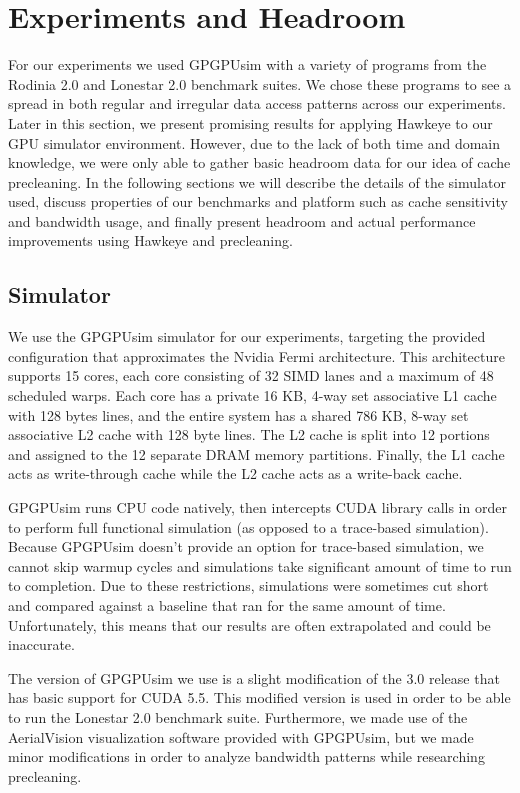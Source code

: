\chapter{Experiments and Headroom}

For our experiments we used GPGPUsim with a variety of programs from the Rodinia 2.0 \cite{rodinia} and Lonestar 2.0 \cite{lonestar} benchmark suites. We chose these programs to see a spread in both regular and irregular data access patterns across our experiments. Later in this section, we present promising results for applying Hawkeye to our GPU simulator environment. However, due to the lack of both time and domain knowledge, we were only able to gather basic headroom data for our idea of cache precleaning. In the following sections we will describe the details of the simulator used, discuss properties of our benchmarks and platform such as cache sensitivity and bandwidth usage, and finally present headroom and actual performance improvements using Hawkeye and precleaning.

\section{Simulator}
We use the GPGPUsim \cite{gpgpusim} simulator for our experiments, targeting the provided configuration that approximates the Nvidia Fermi architecture. This architecture supports 15 cores, each core consisting of 32 SIMD lanes and a maximum of 48 scheduled warps. Each core has a private 16 KB, 4-way set associative L1 cache with 128 bytes lines, and the entire system has a shared 786 KB, 8-way set associative L2 cache with 128 byte lines. The L2 cache is split into 12 portions and assigned to the 12 separate DRAM memory partitions. Finally, the L1 cache acts as write-through cache while the L2 cache acts as a write-back cache.

GPGPUsim runs CPU code natively, then intercepts CUDA library calls in order to perform full functional simulation (as opposed to a trace-based simulation). Because GPGPUsim doesn’t provide an option for trace-based simulation, we cannot skip warmup cycles and simulations take significant amount of time to run to completion. Due to these restrictions, simulations were sometimes cut short and compared against a baseline that ran for the same amount of time. Unfortunately, this means that our results are often extrapolated and could be inaccurate.

The version of GPGPUsim we use is a slight modification of the 3.0 release that has basic support for CUDA 5.5. This modified version is used in order to be able to run the Lonestar 2.0 benchmark suite. Furthermore, we made use of the AerialVision \cite{aerialvision} visualization software provided with GPGPUsim, but we made minor modifications in order to analyze bandwidth patterns while researching precleaning.


